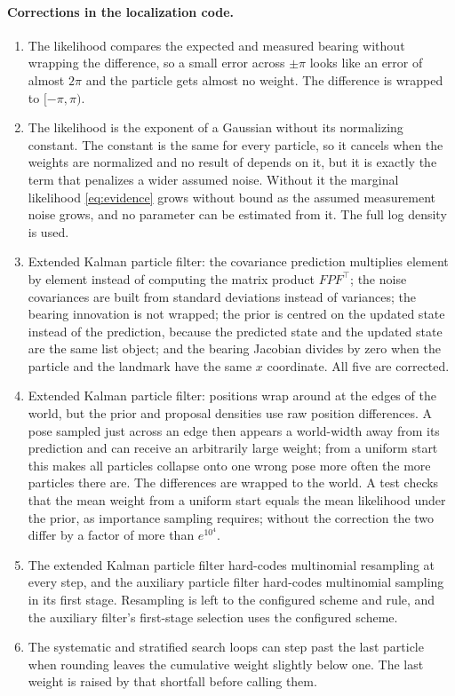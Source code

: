 \paragraph{Corrections in the localization code.}
\begin{enumerate}
  \item The likelihood compares the expected and measured bearing without wrapping the difference, so a small error
        across $\pm\pi$ looks like an error of almost $2\pi$ and the particle gets almost no weight. The difference is
        wrapped to $[-\pi, \pi)$.
  \item The likelihood is the exponent of a Gaussian without its normalizing constant. The constant is the same for
        every particle, so it cancels when the weights are normalized and no result of
         depends on it, but it is exactly the term that penalizes a wider assumed noise.
        Without it the marginal likelihood \eqref{eq:evidence} grows without bound as the assumed measurement noise
        grows, and no parameter can be estimated from it. The full log density is used.
  \item Extended Kalman particle filter: the covariance prediction multiplies element by element instead of computing
        the matrix product $F P F^\top$; the noise covariances are built from standard deviations instead of variances;
        the bearing innovation is not wrapped; the prior is centred on the updated state instead of the prediction,
        because the predicted state and the updated state are the same list object; and the bearing Jacobian divides
        by zero when the particle and the landmark have the same $x$ coordinate. All five are corrected.
  \item Extended Kalman particle filter: positions wrap around at the edges of the world, but the prior and proposal
        densities use raw position differences. A pose sampled just across an edge then appears a world-width away from
        its prediction and can receive an arbitrarily large weight; from a uniform start this makes all particles
        collapse onto one wrong pose more often the more particles there are. The differences are wrapped to the world.
        A test checks that the mean weight from a uniform start equals the mean likelihood under the prior, as importance
        sampling requires; without the correction the two differ by a factor of more than $e^{10^4}$.
  \item The extended Kalman particle filter hard-codes multinomial resampling at every step, and the auxiliary particle
        filter hard-codes multinomial sampling in its first stage. Resampling is left to the configured scheme and rule,
        and the auxiliary filter's first-stage selection uses the configured scheme.
  \item The systematic and stratified search loops can step past the last particle when rounding leaves the cumulative
        weight slightly below one. The last weight is raised by that shortfall before calling them.
\end{enumerate}

